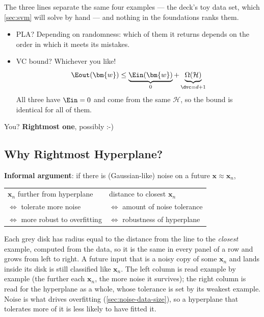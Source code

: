 \begin{center}
    \quad
    \quad
\end{center}

The three lines separate the same four examples --- the deck's toy data set,
which \autoref{sec:svm} will solve by hand --- and nothing in the
foundations ranks them.
\begin{itemize}
    \item PLA? Depending on randomness: which of them it returns depends on
        the order in which it meets its mistakes.
    \item VC bound? Whichever you like!
        \[
            \Eout(\bm{w}) \le \underbrace{\Ein(\bm{w})}_{0} +
            \underbrace{\Omega(\mathcal{H})}_{\dvc = d + 1}
        \]
        All three have \(\Ein = 0\) and come from the same \(\mathcal{H}\),
        so the bound is identical for all of them.
\end{itemize}

\begin{moral}
    You? \textbf{Rightmost one}, possibly :-)
\end{moral}

\subsection{Why Rightmost Hyperplane?}

\begin{center}
    \quad
    \quad
\end{center}

\textbf{Informal argument}: if there is (Gaussian-like) noise on a future
\(\bm{x} \approx \bm{x}_n\),
\begin{center}
    \begin{tabular}{@{}l@{\qquad}l@{}}
        \(\bm{x}_n\) further from hyperplane & distance to closest
            \(\bm{x}_n\)\\
        \(\iff\) tolerate more noise & \(\iff\) amount of noise tolerance\\
        \(\iff\) more robust to overfitting & \(\iff\) robustness of
            hyperplane
    \end{tabular}
\end{center}

Each grey disk has radius equal to the distance from the line to the
\emph{closest} example, computed from the data, so it is the same in every
panel of a row and grows from left to right. A future input that is a noisy
copy of some \(\bm{x}_n\) and lands inside its disk is still classified like
\(\bm{x}_n\). The left column is read example by example (the further each
\(\bm{x}_n\), the more noise it survives); the right column is read for the
hyperplane as a whole, whose tolerance is set by its weakest example.
Noise is what drives overfitting (\autoref{sec:noise-data-size}), so a
hyperplane that tolerates more of it is less likely to have fitted it.

